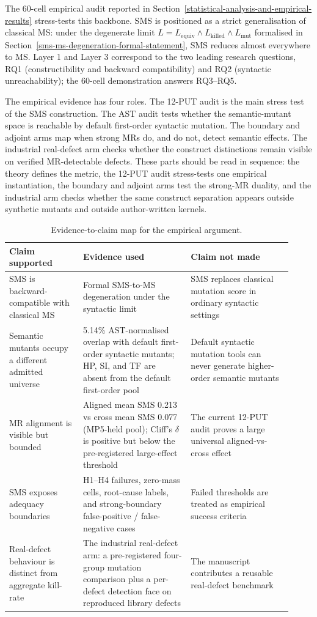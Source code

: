 \documentclass[manuscript,screen,review]{acmart}
\begin{document}
The 60-cell empirical audit reported in Section~\ref{statistical-analysis-and-empirical-results} stress-tests this
backbone. SMS is positioned as a strict generalisation of classical MS:
under the
degenerate limit $L = L_{\mathrm{equiv}} \wedge L_{\mathrm{killed}} \wedge L_{\mathrm{mut}}$
formalised in Section~\ref{sms-ms-degeneration-formal-statement}, SMS reduces almost everywhere to MS. Layer 1 and
Layer 3 correspond to the two leading research questions, RQ1
(constructibility and backward compatibility) and RQ2 (syntactic
unreachability); the 60-cell demonstration answers RQ3--RQ5.

The empirical evidence has four roles. The 12-PUT audit is the main
stress test of the SMS construction. The AST audit tests whether the
semantic-mutant space is reachable by default first-order syntactic
mutation. The boundary and adjoint arms map when strong MRs do, and do
not, detect semantic effects. The industrial real-defect arm checks whether
the construct distinctions remain visible on verified MR-detectable defects.
These parts should be read in sequence: the theory defines the metric,
the 12-PUT audit stress-tests one empirical instantiation, the boundary
and adjoint arms test the strong-MR duality, and the industrial arm
checks whether the same construct separation appears outside synthetic
mutants and outside author-written kernels.

\begin{table}[t]
\caption{Evidence-to-claim map for the empirical argument.}
\label{tab:claim-evidence-map}
\centering
\small
\begin{tabular}{p{0.24\linewidth}p{0.35\linewidth}p{0.33\linewidth}}
\toprule
Claim supported & Evidence used & Claim not made \\
\midrule
SMS is backward-compatible with classical MS & Formal SMS-to-MS
degeneration under the syntactic limit & SMS replaces classical mutation
score in ordinary syntactic settings \\
Semantic mutants occupy a different admitted universe & 5.14\%
AST-normalised overlap with default first-order syntactic mutants;
HP, SI, and TF are absent from the default first-order pool & Default
syntactic mutation tools can never generate higher-order semantic
mutants \\
MR alignment is visible but bounded & Aligned mean SMS 0.213 vs
cross mean SMS 0.077 (MP5-held pool); Cliff's \(\delta\) is positive but below the
pre-registered large-effect threshold & The current 12-PUT audit proves
a large universal aligned-vs-cross effect \\
SMS exposes adequacy boundaries & H1--H4 failures, zero-mass cells,
root-cause labels, and strong-boundary false-positive / false-negative
cases & Failed thresholds are treated as empirical success criteria \\
Real-defect behaviour is distinct from aggregate kill-rate & The
industrial real-defect arm: a pre-registered four-group mutation
comparison plus a per-defect detection face on reproduced library
defects & The manuscript contributes a reusable
real-defect benchmark \\
\bottomrule
\end{tabular}
\normalsize
\end{table}
\end{document}
